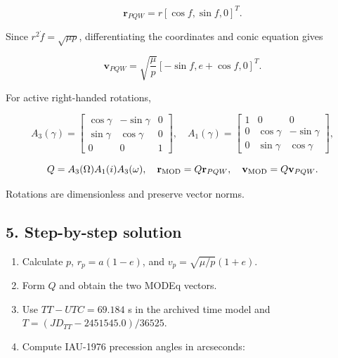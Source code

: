 \documentclass[10pt,a4paper]{article}
\numberwithin{equation}{section}
\begin{document}
\begin{equation}\mathbf r_{PQW}=r[\cos f,\sin f,0]^T.\label{eq:ch1-2}\end{equation}

\begin{sloppypar}Since \(r^2\dot f=\sqrt{\mu p}\), differentiating the coordinates and conic equation gives\end{sloppypar}


\begin{equation}\mathbf v_{PQW}=\sqrt{\frac{\mu}{p}}[-\sin f,e+\cos f,0]^T.\label{eq:ch1-3}\end{equation}

\begin{sloppypar}For active right-handed rotations,\end{sloppypar}


\begin{equation}A_3(\gamma)=\begin{bmatrix}\cos\gamma&-\sin\gamma&0\\\sin\gamma&\cos\gamma&0\\0&0&1\end{bmatrix},
\quad A_1(\gamma)=\begin{bmatrix}1&0&0\\0&\cos\gamma&-\sin\gamma\\0&\sin\gamma&\cos\gamma\end{bmatrix},\label{eq:ch1-4}\end{equation}

\begin{equation}Q=A_3(\Omega)A_1(i)A_3(\omega),\quad
\mathbf r_{\rm MOD}=Q\mathbf r_{PQW},\quad \mathbf v_{\rm MOD}=Q\mathbf v_{PQW}.\label{eq:ch1-5}\end{equation}

\begin{sloppypar}Rotations are dimensionless and preserve vector norms.\end{sloppypar}


\subsection*{5. Step-by-step solution}
\begin{enumerate}
\item Calculate \(p\), \(r_p=a(1-e)\), and \(v_p=\sqrt{\mu/p}(1+e)\).
\item Form \(Q\) and obtain the two MODEq vectors.
\item Use \(TT-UTC=69.184\) s in the archived time model and \(T=(JD_{TT}-2451545.0)/36525\).
\item Compute IAU-1976 precession angles in arcseconds:
\end{enumerate}
\end{document}

